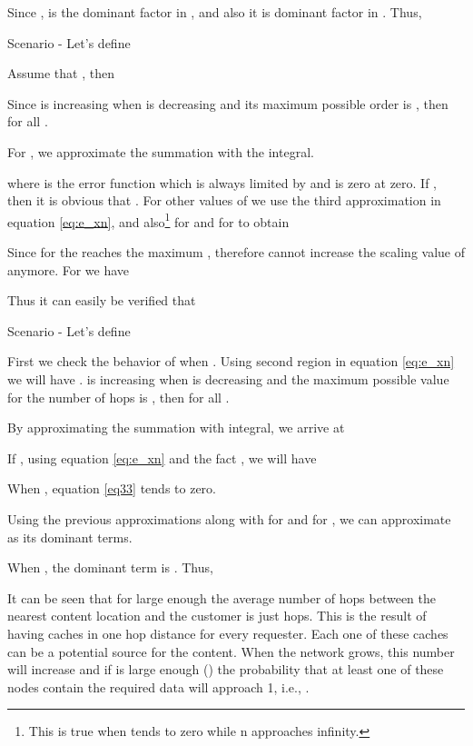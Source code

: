 \documentclass[journal]{IEEEtran}
\theoremstyle{plain}
\theoremstyle{remark}
\begin{document}
\begin{IEEEproof}
Since  ,  is the dominant factor in , and also it is dominant factor in . Thus,



Scenario  - Let's define 




Assume that , then 

Since  is increasing when   is decreasing and its maximum possible order is , then  for all .

For , we approximate the summation with the integral.




where  is the error function which is always limited by  and is zero at zero.
If , then it is obvious that . For other values of  we use the third approximation in equation \eqref{eq:e_xn}, and also\footnote{This is true when  tends to zero while n approaches infinity.}  for  and  for  to obtain


Since for  the  reaches the maximum , therefore  cannot increase the scaling value of  anymore.
For   we have


Thus it can easily be verified that




Scenario  - Let's define




	
	First we check the behavior of  when . Using second region in equation \eqref{eq:e_xn} we will have .  is increasing when  is decreasing and the maximum possible value for the number of hops is , then  for all .
	
	By approximating the summation with integral, we arrive at
	

	

	If , using equation \eqref{eq:e_xn} and the fact , we will have
		
	When , equation \eqref{eq33} tends to zero.
	

	Using the previous approximations along with  for  and  for , we can approximate  as its dominant terms.
	
	
	
	When , the dominant term is . Thus,
	
	
	
	It can be seen that for large enough  the average number of hops between the nearest content location and the customer is just  hops. This is the result of having  caches in one hop distance for  every requester. Each one of these caches can be  a potential source for the content. When the network grows, this number will increase and if  is large enough () the probability that at least one of these nodes contain the required data will approach 1, i.e., .
	
	\end{IEEEproof}
	
\end{document}
